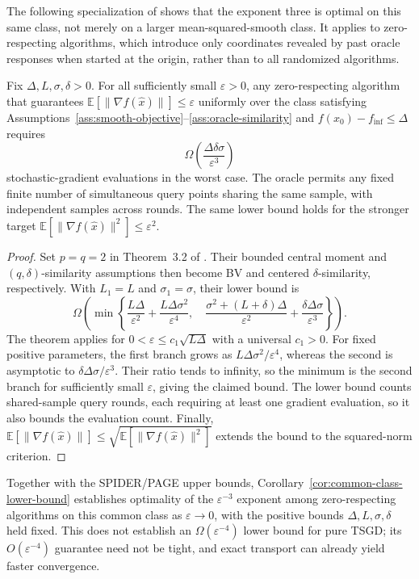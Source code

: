 The following specialization of \citet{pmlr-v300-fradin26a} shows
that the exponent three is optimal on this same class, not merely
on a larger mean-squared-smooth class. It applies to zero-respecting
algorithms, which introduce only coordinates revealed by past oracle
responses when started at the origin, rather than to all randomized
algorithms.

\begin{corollary}
\label{cor:common-class-lower-bound}
Fix $\Delta,L,\sigma,\delta>0$. For all sufficiently small
$\varepsilon>0$, any zero-respecting algorithm that guarantees
$\mathbb E[\|\nabla f(\widehat x)\|]\leq\varepsilon$ uniformly over
the class satisfying
Assumptions~\ref{ass:smooth-objective}--\ref{ass:oracle-similarity}
and $f(x_0)-f_{\inf}\leq\Delta$ requires
\begin{equation}
\label{eq:common-class-oracle-lower-bound}
\Omega\!\left(\frac{\Delta\delta\sigma}{\varepsilon^3}\right)
\end{equation}
stochastic-gradient evaluations in the worst case.
The oracle permits any fixed finite number of simultaneous query
points sharing the same sample, with independent samples across rounds.
The same lower bound holds for the stronger target
$\mathbb E[\|\nabla f(\widehat x)\|^2]\leq\varepsilon^2$.
\end{corollary}

\begin{proof}
Set $p=q=2$ in Theorem~3.2 of \citet{pmlr-v300-fradin26a}.
Their bounded central moment and $(q,\delta)$-similarity assumptions
then become BV and centered $\delta$-similarity, respectively.
With $L_1=L$ and $\sigma_1=\sigma$, their lower bound is
\[
\Omega\!\left(
\min\left\{
\frac{L\Delta}{\varepsilon^2}
+\frac{L\Delta\sigma^2}{\varepsilon^4},
\quad
\frac{\sigma^2+(L+\delta)\Delta}{\varepsilon^2}
+\frac{\delta\Delta\sigma}{\varepsilon^3}
\right\}
\right).
\]
The theorem applies for $0<\varepsilon\leq c_1\sqrt{L\Delta}$
with a universal $c_1>0$.
For fixed positive parameters, the first branch grows as
$L\Delta\sigma^2/\varepsilon^4$, whereas the second is asymptotic to
$\delta\Delta\sigma/\varepsilon^3$. Their ratio tends to infinity,
so the minimum is the second branch for sufficiently small
$\varepsilon$, giving the claimed bound.
The lower bound counts shared-sample query rounds, each requiring
at least one gradient evaluation, so it also bounds the evaluation
count. Finally,
$\mathbb E[\|\nabla f(\widehat x)\|]
\leq\sqrt{\mathbb E[\|\nabla f(\widehat x)\|^2]}$
extends the bound to the squared-norm criterion.
\end{proof}

Together with the SPIDER/PAGE upper bounds,
Corollary~\ref{cor:common-class-lower-bound} establishes optimality
of the $\varepsilon^{-3}$ exponent among zero-respecting algorithms
on this common class as $\varepsilon\to0$, with the positive bounds
$\Delta,L,\sigma,\delta$ held fixed. This does not establish an
$\Omega(\varepsilon^{-4})$ lower bound for pure TSGD; its
$O(\varepsilon^{-4})$ guarantee need not be tight, and exact transport
can already yield faster convergence.
